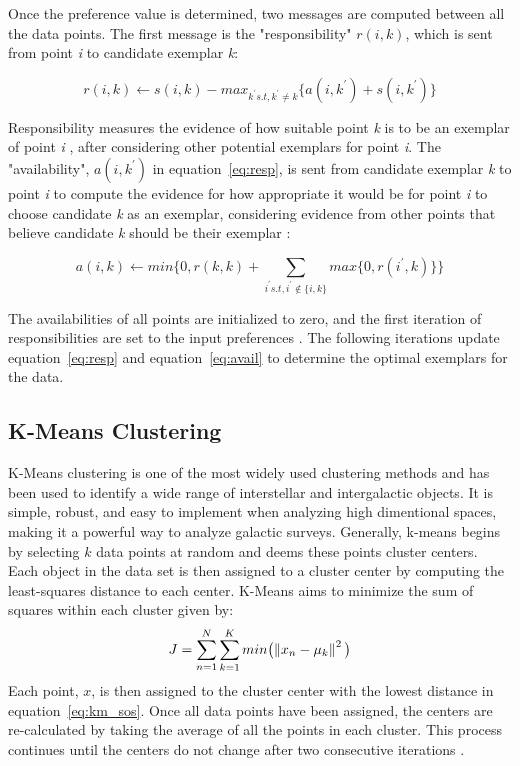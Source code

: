 Once the preference value is determined, two messages are computed between all the data points.
The first message is the "responsibility" $r(i,k)$, which is sent from point \textit{i} to candidate exemplar \textit{k}:\citet{frey07}

\begin{equation}
\label{eq:resp}
r(i,k) \leftarrow s(i,k) - max_{k^\prime s.t,  k^\prime \neq k} \{ a(i,k^\prime) + s(i,k^\prime) \}
\end{equation}

Responsibility measures the evidence of how suitable point \textit{k} is to be an exemplar of point \textit{i} \citet{frey07}, after considering other potential exemplars for point \textit{i}.
The "availability", $a(i,k^\prime)$ in equation~\ref{eq:resp}, is sent from candidate exemplar \textit{k} to point \textit{i} to compute the evidence for how appropriate it would be for point \textit{i} to choose candidate \textit{k} as an exemplar, considering evidence from other points that believe candidate \textit{k} should be their exemplar \citet{frey07}: 

\begin{equation}
\label{eq:avail}
a(i,k) \leftarrow min\Big\{ 0, r(k,k) + \sum\limits_{i^\prime s.t, i^\prime \notin \{i,k\}} max\{0, r(i^\prime, k)\}\Big\}
\end{equation}

The availabilities of all points are initialized to zero, and the first iteration of responsibilities are set to the input preferences \citet{frey07}. 
The following iterations update equation~\ref{eq:resp} and equation~\ref{eq:avail} to determine the optimal exemplars for the data.

\subsection{K-Means Clustering}
K-Means clustering is one of the most widely used clustering methods and has been used to identify a wide range of interstellar and intergalactic objects. %
It is simple, robust, and easy to implement when analyzing high dimentional spaces, making it a powerful way to analyze galactic surveys. 
Generally, k-means begins by selecting $k$ data points at random and deems these points cluster centers. 
Each object in the data set is then assigned to a cluster center by computing the least-squares distance to each center.
K-Means aims to minimize the sum of squares within each cluster given by:
\begin{equation} 
\label{eq:km_sos}
J = \sum_{n=1}^N \sum_{k=1}^K min \big( \norm{x_n - \mu_k}^2 \big)
\end{equation}
Each point, $x$, is then assigned to the cluster center with the lowest distance in equation~\ref{eq:km_sos}\citet{tammour16}.
Once all data points have been assigned, the centers are re-calculated by taking the average of all the points in each cluster. 
This process continues until the centers do not change after two consecutive iterations \citet{sanchez-almeida13}. 

